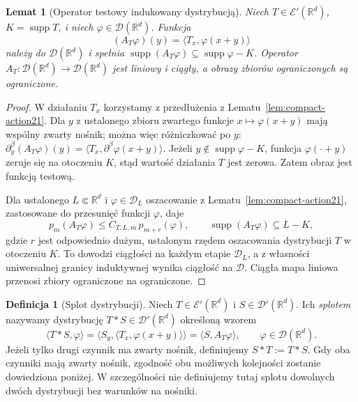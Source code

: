 \documentclass[11pt,a4paper]{article}
\numberwithin{equation}{section}
\theoremstyle{plain}
\newtheorem{lemat}[twierdzenie]{Lemat}
\theoremstyle{definition}
\newtheorem{definicja}[twierdzenie]{Definicja}
\theoremstyle{remark}
\newcommand{\R}{\mathbb R}
\DeclareMathOperator{\supp}{supp}
\begin{document}
\begin{lemat}[Operator testowy indukowany dystrybucją]
\label{lem:convolution-transpose21}
Niech $T\in\mathcal E'(\R^d)$, $K=\supp T$, i niech
$\varphi\in\mathcal D(\R^d)$. Funkcja
\[
 (A_T\varphi)(y)=\langle T_x,\varphi(x+y)\rangle
\]
należy do $\mathcal D(\R^d)$ i spełnia
$\supp(A_T\varphi)\subseteq\supp\varphi-K$.
Operator $A_T:\mathcal D(\R^d)\to\mathcal D(\R^d)$
jest liniowy i ciągły, a obrazy zbiorów ograniczonych
są ograniczone.
\end{lemat}
\begin{proof}
W działaniu $T_x$ korzystamy z przedłużenia z
Lematu~\ref{lem:compact-action21}. Dla $y$ z ustalonego
zbioru zwartego funkcje $x\mapsto\varphi(x+y)$ mają
wspólny zwarty nośnik; można więc różniczkować po $y$:
$\partial_y^\beta(A_T\varphi)(y)=
\langle T_x,\partial^\beta\varphi(x+y)\rangle$.
Jeżeli $y\notin\supp\varphi-K$, funkcja
$\varphi(\cdot+y)$ zeruje się na otoczeniu $K$,
stąd wartość działania $T$ jest zerowa. Zatem obraz
jest funkcją testową.

Dla ustalonego $L\Subset\R^d$ i
$\varphi\in\mathcal D_L$ oszacowanie z
Lematu~\ref{lem:compact-action21}, zastosowane do
przesunięć funkcji $\varphi$, daje
\[
 p_m(A_T\varphi)\le C_{T,L,m}\,p_{m+r}(\varphi),
 \qquad \supp(A_T\varphi)\subseteq L-K,
\]
gdzie $r$ jest odpowiednio dużym, ustalonym rzędem
oszacowania dystrybucji $T$ w otoczeniu $K$.
To dowodzi ciągłości na każdym etapie $\mathcal D_L$,
a z własności uniwersalnej granicy induktywnej
wynika ciągłość na $\mathcal D$. Ciągła mapa liniowa
przenosi zbiory ograniczone na ograniczone.
\end{proof}

\begin{definicja}[Splot dystrybucji]
\label{def:convolution21}
Niech $T\in\mathcal E'(\R^d)$ i
$S\in\mathcal D'(\R^d)$. Ich \emph{splotem} nazywamy
dystrybucję $T*S\in\mathcal D'(\R^d)$ określoną wzorem
\[
 \langle T*S,\varphi\rangle
 =\langle S_y,\langle T_x,\varphi(x+y)\rangle\rangle
 =\langle S,A_T\varphi\rangle,
 \qquad\varphi\in\mathcal D(\R^d).
\]
Jeżeli tylko drugi czynnik ma zwarty nośnik, definiujemy
$S*T:=T*S$. Gdy oba czynniki mają zwarty nośnik,
zgodność obu możliwych kolejności zostanie dowiedziona
poniżej. W szczególności nie definiujemy tutaj splotu
dowolnych dwóch dystrybucji bez warunków na nośniki.
\end{definicja}
\end{document}
